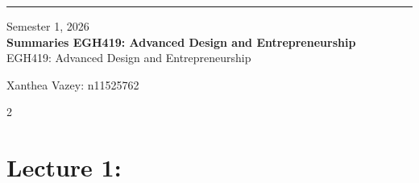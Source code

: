 \documentclass[10pt, twoside, a4paper]{article}
\newcommand{\TitleName}{Summaries EGH419: Advanced Design and Entrepreneurship}
\newcommand{\unitTime}{Semester 1, 2026}
\newcommand{\unitName}{EGH419: Advanced Design and Entrepreneurship}
\newcommand{\documentAuthors}{Xanthea Vazey: n11525762}
\begin{document}

    \begin{titlepage}
        \thispagestyle{empty}
        \vspace*{0.25\textheight}
        
        \noindent
        \begin{minipage}[t]{0.03\textwidth}

            \rule[-15ex]{1pt}{95pt}   %
        \end{minipage}
        \hspace{1em}
        \begin{minipage}[t]{0.9\textwidth}
            \normalsize{\unitTime} \\[1.5ex]
            \Huge\textbf{\TitleName} \\[1.5ex]
            \normalsize{\unitName}
        \end{minipage}
        \vfill

        \begin{flushleft}
            \documentAuthors
        \end{flushleft}
    \end{titlepage}

    \newpage


    \begin{multicols}{2}

    \tableofcontents
\newpage

\section{Lecture 1:}




\end{multicols}
\end{document}
